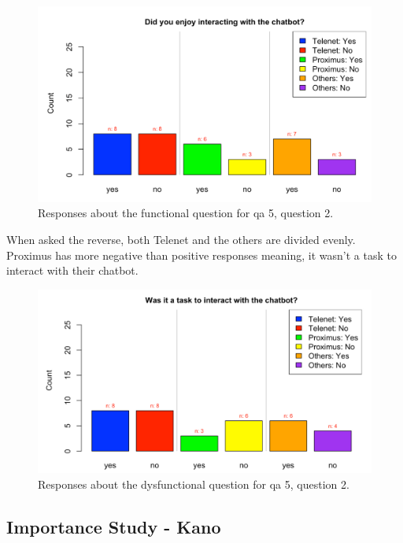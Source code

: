 \begin{figure}[!htb]
	\includegraphics[width=\linewidth, scale=0.5]{../LaTeX/Figures/Comparative/Q5b.png}
	\caption{Responses about the functional question for \acrshort{qa} 5, question 2.}\label{fig:Q5b}
\end{figure}
When asked the reverse, both Telenet and the others are divided evenly. Proximus has more negative than positive responses meaning, it wasn't a task to interact with their chatbot.\\
\begin{figure}[!htb]
	\includegraphics[width=\linewidth, scale=0.5]{../LaTeX/Figures/Comparative/DQ5b.png}
	\caption{Responses about the dysfunctional question for \acrshort{qa} 5, question 2.}\label{fig:DQ5b}
\end{figure}
\FloatBarrier
\subsection{Importance Study - Kano}
